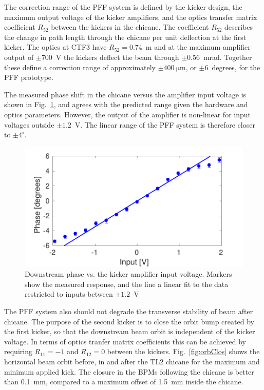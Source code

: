 \documentclass[%
 reprint,
 amsmath,amssymb,
 prl,
]{revtex4-1}
\begin{document}
The correction range of the PFF system is defined by the kicker design, the 
maximum output voltage of the kicker amplifiers, and the optics transfer matrix 
coefficient \(R_{52}\) between the kickers in the chicane. The coefficient 
\(R_{52}\) describes the change in path length through the chicane per unit 
deflection at the first kicker. The optics at CTF3 have \(R_{52} = 0.74\)~m and 
at the maximum amplifier output 
of \(\pm700\)~V the kickers deflect the beam through \(\pm0.56\)~mrad. Together 
these 
define a correction range of approximately \(\pm400~\mathrm{\mu m}\), or 
\(\pm6\)~degrees, for the PFF 
prototype.

The measured phase shift in the chicane versus the amplifier input voltage is 
shown in Fig.~\ref{fig:corrRange}, and agrees with the predicted range given 
the hardware and optics parameters. However, the output of the amplifier is 
non-linear for input voltages outside \(\pm1.2\)~V. The 
linear range of the PFF system is therefore closer to \(\pm4^\circ\).


\begin{figure}
	\includegraphics[width=\columnwidth]{figs/corrRange}
	\caption{\label{fig:corrRange}Downstream phase vs. the kicker amplifier 
	input voltage. Markers show the measured response, and the line a linear 
	fit to the data restricted to inputs between \(\pm1.2\)~V}
\end{figure}

The PFF system also should not degrade the transverse stability of beam after 
chicane. The purpose of the second kicker is to close the orbit bump created by 
the first kicker, so that the downstream beam orbit is independent of the 
kicker voltage. In terms of optics tranfer matrix coefficients this can be 
achieved by requiring \(R_{11}=-1\) and \(R_{12}=0\) between the 
kickers. Fig.~\ref{fig:orbClos} shows the horizontal beam orbit before, in and 
after the TL2 chicane for the maximum and minimum applied kick. The closure in 
the BPMs following the chicane is better than 0.1~mm, compared to a maximum 
offset of 1.5~mm inside the chicane.
\end{document}
